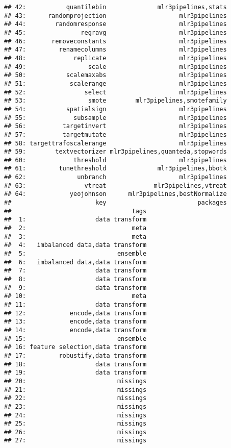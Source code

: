 \documentclass[
]{scrbook}
\begin{document}
\begin{verbatim}
## 42:           quantilebin              mlr3pipelines,stats
## 43:      randomprojection                    mlr3pipelines
## 44:        randomresponse                    mlr3pipelines
## 45:               regravg                    mlr3pipelines
## 46:       removeconstants                    mlr3pipelines
## 47:         renamecolumns                    mlr3pipelines
## 48:             replicate                    mlr3pipelines
## 49:                 scale                    mlr3pipelines
## 50:           scalemaxabs                    mlr3pipelines
## 51:            scalerange                    mlr3pipelines
## 52:                select                    mlr3pipelines
## 53:                 smote        mlr3pipelines,smotefamily
## 54:           spatialsign                    mlr3pipelines
## 55:             subsample                    mlr3pipelines
## 56:          targetinvert                    mlr3pipelines
## 57:          targetmutate                    mlr3pipelines
## 58: targettrafoscalerange                    mlr3pipelines
## 59:        textvectorizer mlr3pipelines,quanteda,stopwords
## 60:             threshold                    mlr3pipelines
## 61:         tunethreshold              mlr3pipelines,bbotk
## 62:              unbranch                    mlr3pipelines
## 63:                vtreat             mlr3pipelines,vtreat
## 64:            yeojohnson      mlr3pipelines,bestNormalize
##                       key                         packages
##                                 tags
##  1:                   data transform
##  2:                             meta
##  3:                             meta
##  4:   imbalanced data,data transform
##  5:                         ensemble
##  6:   imbalanced data,data transform
##  7:                   data transform
##  8:                   data transform
##  9:                   data transform
## 10:                             meta
## 11:                   data transform
## 12:            encode,data transform
## 13:            encode,data transform
## 14:            encode,data transform
## 15:                         ensemble
## 16: feature selection,data transform
## 17:         robustify,data transform
## 18:                   data transform
## 19:                   data transform
## 20:                         missings
## 21:                         missings
## 22:                         missings
## 23:                         missings
## 24:                         missings
## 25:                         missings
## 26:                         missings
## 27:                         missings

\end{verbatim}
\end{document}
